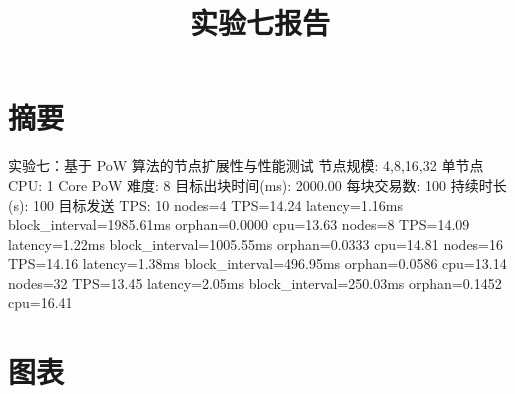 \documentclass{ctexart}
\title{实验七报告}
\date{}
\begin{document}
\maketitle
\section*{摘要}
实验七：基于 PoW 算法的节点扩展性与性能测试
节点规模: 4,8,16,32
单节点 CPU: 1 Core
PoW 难度: 8
目标出块时间(ms): 2000.00
每块交易数: 100
持续时长(s): 100
目标发送 TPS: 10
nodes=4 TPS=14.24 latency=1.16ms block_interval=1985.61ms orphan=0.0000 cpu=13.63%
nodes=8 TPS=14.09 latency=1.22ms block_interval=1005.55ms orphan=0.0333 cpu=14.81%
nodes=16 TPS=14.16 latency=1.38ms block_interval=496.95ms orphan=0.0586 cpu=13.14%
nodes=32 TPS=13.45 latency=2.05ms block_interval=250.03ms orphan=0.1452 cpu=16.41%
\section*{图表}
\end{document}
